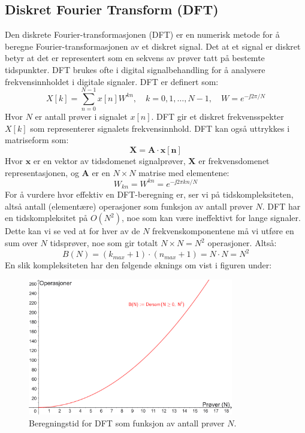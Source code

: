 \subsection{Diskret Fourier Transform (DFT)}
Den diskrete Fourier-transformasjonen (DFT) er en numerisk metode for å beregne Fourier-transformasjonen av et diskret signal. Det at et signal er diskret betyr at det er representert som en sekvens av prøver tatt på bestemte tidspunkter. DFT brukes ofte i digital signalbehandling for å analysere frekvensinnholdet i digitale signaler. DFT er definert som:
\begin{equation}
    X[k] = \sum_{n=0}^{N-1} x[n] W^{kn}, \quad k = 0, 1, \ldots, N-1, \quad W = e^{-\jj 2 \pi / N}
    \label{DFT}
\end{equation}
Hvor $N$ er antall prøver i signalet $x[n]$. DFT gir et diskret frekvensspekter $X[k]$ som representerer signalets frekvensinnhold. DFT kan også uttrykkes i matriseform som:
\begin{equation}
    \mathbf{X} = \mathbf{A} \cdot \mathbf{x[n]}
\end{equation}
Hvor $\mathbf{x}$ er en vektor av tidsdomenet signalprøver, $\mathbf{X}$ er frekvensdomenet representasjonen, og $\mathbf{A}$ er en $N \times N$ matrise med elementene:
\[
    W_{kn} = W^{kn} = e^{-\jj 2 \pi kn / N}
\]
For å vurdere hvor effektiv en DFT-beregning er, ser vi på tidskompleksiteten, altså antall (elementære) operasjoner som funksjon av antall prøver $N$. DFT har en tidskompleksitet på $O(N^2)$, noe som kan være ineffektivt for lange signaler. Dette kan vi se ved at for hver av de $N$ frekvenskomponentene må vi utføre en sum over $N$ tidsprøver, noe som gir totalt $N \times N = N^2$ operasjoner. Altså:
\[
    B(N) = (k_{max} + 1) \cdot (n_{max}+1) = N \cdot N = N^2
\]
En slik kompleksiteten har den følgende øknings om vist i figuren under:
\begin{figure}[h]
    \centering
    \includegraphics[width=0.8\textwidth]{./Media/DFT_Complexity.png}
    \caption{Beregningstid for DFT som funksjon av antall prøver $N$.}
    \label{fig:DFT_Complexity}
\end{figure}
\clearpage
\noindent
